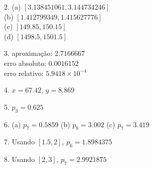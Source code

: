 \documentclass{article}
\begin{document}
\noindent{}2. (a) $[3.138451061, 3.144734246]$ \\
(b) $[1.412799349, 1.415627776]$ \\
(c) $[149.85, 150.15]$ \\
(d) $[1498.5, 1501.5]$

\noindent{}3. aproxima\c{c}\~ao: $2.7166667$ \\
erro absoluto: $0.0016152$ \\
erro relativo: $5.9418\times{}10^{-4}$

\noindent{}4. $x = 67.42$, $y = 8.869$

\noindent{}5. $p_3 = 0.625$

\noindent{}6. (a) $p_7 = 0.5859$ (b) $p_8 = 3.002$ (c) $p_7 = 3.419$

\noindent{}7. Usando $[1.5, 2]$, $p_6 = 1.8984375$

\noindent{}8. Usando $[2, 3]$, $p_7 = 2.9921875$
\end{document}
